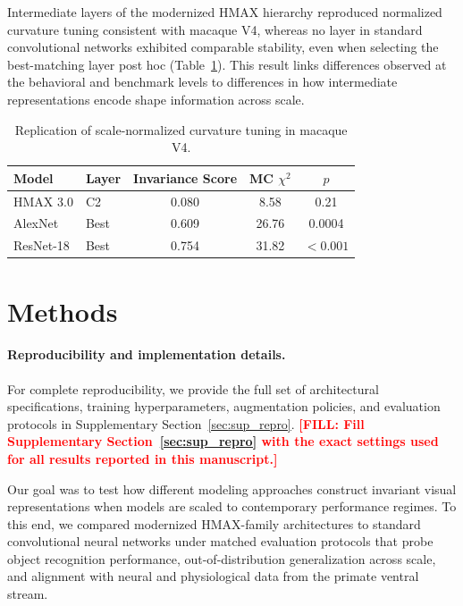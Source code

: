 \documentclass[pdflatex,sn-nature]{sn-jnl}
\newcommand{\FILL}[1]{\textcolor{red}{\textbf{[FILL: #1]}}}
\begin{document}
Intermediate layers of the modernized HMAX hierarchy reproduced normalized curvature tuning consistent with macaque V4, whereas no layer in standard convolutional networks exhibited comparable stability, even when selecting the best-matching layer post hoc (Table~\ref{tab:pasupathy_scores}). This result links differences observed at the behavioral and benchmark levels to differences in how intermediate representations encode shape information across scale.

\begin{table}
\centering
\begin{tabular}{llccc}
\toprule
Model & Layer & Invariance Score & MC $\chi^2$ & $p$ \\
\midrule
HMAX 3.0 & C2 & 0.080 & 8.58 & 0.21 \\
AlexNet & Best & 0.609 & 26.76 & 0.0004 \\
ResNet-18 & Best & 0.754 & 31.82 & $<0.001$ \\
\bottomrule
\end{tabular}
\caption{Replication of scale-normalized curvature tuning in macaque V4.}
\label{tab:pasupathy_scores}
\end{table}

\section{Methods}


\paragraph{Reproducibility and implementation details.}
For complete reproducibility, we provide the full set of architectural specifications, training hyperparameters, augmentation policies, and evaluation protocols in Supplementary Section~\ref{sec:sup_repro}.
\FILL{Fill Supplementary Section~\ref{sec:sup_repro} with the exact settings used for all results reported in this manuscript.}

Our goal was to test how different modeling approaches construct invariant visual representations when models are scaled to contemporary performance regimes. To this end, we compared modernized HMAX-family architectures to standard convolutional neural networks under matched evaluation protocols that probe object recognition performance, out-of-distribution generalization across scale, and alignment with neural and physiological data from the primate ventral stream.
\end{document}
